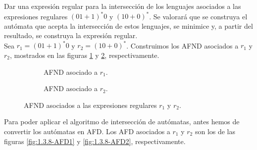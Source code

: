 \begin{ejercicio}\label{ej:1.3.8}
    Dar una expresión regular para la intersección de los lenguajes asociados a las expresiones regulares ${(01+1)}^{\ast}0$ y ${(10+0)}^{\ast}$. Se valorará que se construya el autómata que acepta la intersección de estos lenguajes, se minimice y, a partir del resultado, se construya la expresión regular.\\

    Sea $r_1=(01+1)^{\ast}0$ y $r_2=(10+0)^{\ast}$. Construimos los AFND asociados a $r_1$ y $r_2$, mostrados en las figuras \ref{fig:1.3.8-AFND1} y \ref{fig:1.3.8-AFND2}, respectivamente.
    \begin{figure}
        \centering
        \begin{subfigure}[c]{0.45\textwidth}
            \centering
            \caption{AFND asociado a $r_1$.}
            \label{fig:1.3.8-AFND1}
        \end{subfigure}
        \begin{subfigure}[c]{0.45\textwidth}
            \centering
            \caption{AFND asociado a $r_2$.}
            \label{fig:1.3.8-AFND2}
        \end{subfigure}
        \caption{AFND asociados a las expresiones regulares $r_1$ y $r_2$.}
        \label{fig:1.3.8-AFND}
    \end{figure}

    Para poder aplicar el algoritmo de intersección de autómatas, antes hemos de convertir los autómatas en AFD. Los AFD asociados a $r_1$ y $r_2$ son los de las figuras \ref{fig:1.3.8-AFD1} y \ref{fig:1.3.8-AFD2}, respectivamente.
    \begin{figure}
        \centering
        \begin{subfigure}[c]{0.45\textwidth}
            \centering
\end{subfigure}
\end{figure}
\end{ejercicio}
